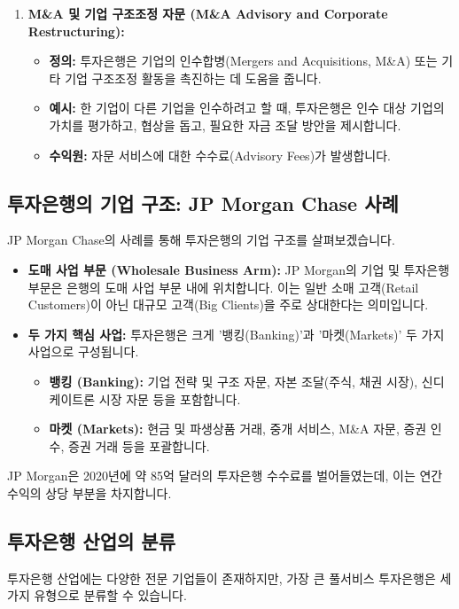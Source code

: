 \documentclass[11pt,a4paper]{article}
\begin{document}
\begin{enumerate}
    \item \textbf{M\&A 및 기업 구조조정 자문 (M\&A Advisory and Corporate Restructuring):}
    \begin{itemize}
        \item \textbf{정의:} 투자은행은 기업의 인수합병(Mergers and Acquisitions, M\&A) 또는 기타 기업 구조조정 활동을 촉진하는 데 도움을 줍니다.
        \item \textbf{예시:} 한 기업이 다른 기업을 인수하려고 할 때, 투자은행은 인수 대상 기업의 가치를 평가하고, 협상을 돕고, 필요한 자금 조달 방안을 제시합니다.
        \item \textbf{수익원:} 자문 서비스에 대한 수수료(Advisory Fees)가 발생합니다.
    \end{itemize}
\end{enumerate}

\subsection{투자은행의 기업 구조: JP Morgan Chase 사례}
JP Morgan Chase의 사례를 통해 투자은행의 기업 구조를 살펴보겠습니다.
\begin{itemize}
    \item \textbf{도매 사업 부문 (Wholesale Business Arm):} JP Morgan의 기업 및 투자은행 부문은 은행의 도매 사업 부문 내에 위치합니다. 이는 일반 소매 고객(Retail Customers)이 아닌 대규모 고객(Big Clients)을 주로 상대한다는 의미입니다.
    \item \textbf{두 가지 핵심 사업:} 투자은행은 크게 '뱅킹(Banking)'과 '마켓(Markets)' 두 가지 사업으로 구성됩니다.
    \begin{itemize}
        \item \textbf{뱅킹 (Banking):} 기업 전략 및 구조 자문, 자본 조달(주식, 채권 시장), 신디케이트론 시장 자문 등을 포함합니다.
        \item \textbf{마켓 (Markets):} 현금 및 파생상품 거래, 중개 서비스, M\&A 자문, 증권 인수, 증권 거래 등을 포괄합니다.
    \end{itemize}
\end{itemize}
JP Morgan은 2020년에 약 85억 달러의 투자은행 수수료를 벌어들였는데, 이는 연간 수익의 상당 부분을 차지합니다.

\subsection{투자은행 산업의 분류}
투자은행 산업에는 다양한 전문 기업들이 존재하지만, 가장 큰 풀서비스 투자은행은 세 가지 유형으로 분류할 수 있습니다.
\end{document}
